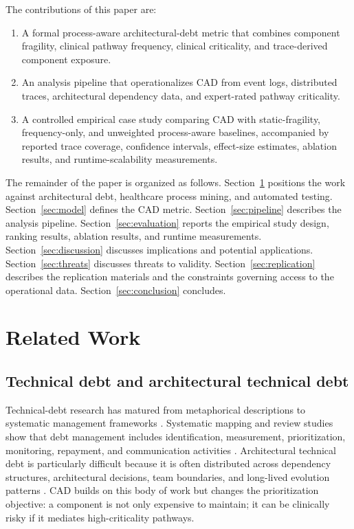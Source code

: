\documentclass[english,preprint]{elsarticle}
\newcommand{\CAD}{\textsc{CAD}\xspace}
\begin{document}
The contributions of this paper are:
\begin{enumerate}
  \item A formal process-aware architectural-debt metric that combines component fragility, clinical pathway frequency, clinical criticality, and trace-derived component exposure.
  \item An analysis pipeline that operationalizes \CAD from event logs, distributed traces, architectural dependency data, and expert-rated pathway criticality.
  \item A controlled empirical case study comparing \CAD with static-fragility, frequency-only, and unweighted process-aware baselines, accompanied by reported trace coverage, confidence intervals, effect-size estimates, ablation results, and runtime-scalability measurements.
\end{enumerate}

The remainder of the paper is organized as follows. Section~\ref{sec:related} positions the work against architectural debt, healthcare process mining, and automated testing. Section~\ref{sec:model} defines the \CAD metric. Section~\ref{sec:pipeline} describes the analysis pipeline. Section~\ref{sec:evaluation} reports the empirical study design, ranking results, ablation results, and runtime measurements. Section~\ref{sec:discussion} discusses implications and potential applications. Section~\ref{sec:threats} discusses threats to validity. Section~\ref{sec:replication} describes the replication materials and the constraints governing access to the operational data. Section~\ref{sec:conclusion} concludes.

\section{Related Work}\label{sec:related}

\subsection{Technical debt and architectural technical debt}

Technical-debt research has matured from metaphorical descriptions to systematic management frameworks \cite{Cunningham1992WyCash,Kruchten2012TechnicalDebt,Li2015TechnicalDebt}. Systematic mapping and review studies show that debt management includes identification, measurement, prioritization, monitoring, repayment, and communication activities \cite{Alves2016TechnicalDebt,Rios2018TertiaryStudy,Lenarduzzi2021Prioritization}. Architectural technical debt is particularly difficult because it is often distributed across dependency structures, architectural decisions, team boundaries, and long-lived evolution patterns \cite{Martini2015ATD,Xiao2016ArchitecturalDebt,Soliman2021DesignDecisions,Verdecchia2021Theory}. \CAD builds on this body of work but changes the prioritization objective: a component is not only expensive to maintain; it can be clinically risky if it mediates high-criticality pathways.
\end{document}
